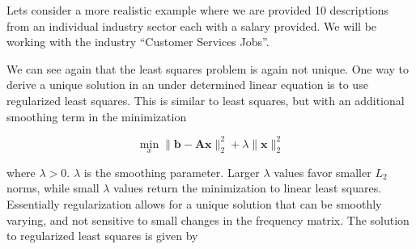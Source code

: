 \documentclass[12pt]{article}
\begin{document}
    Lets consider a more realistic example where we are provided 10
    descriptions from an individual industry sector each with a salary
    provided. We will be working with the industry ``Customer Services Jobs''. 
    
    \begin{center} 
        
        
    \end{center}

    We can see again that the least squares problem is again not unique. One
    way to derive a unique solution in an under determined linear equation is
    to use regularized least squares. This is similar to least squares, but
    with an additional smoothing term in the minimization

    \begin{equation}
        \min_x \|\bm{b} - \bm{Ax}\|_2^2 + \lambda\|\bm{x}\|_2^2
    \end{equation}

    \noindent where $\lambda > 0$. $\lambda$ is the smoothing parameter. Larger
    $\lambda$ values favor smaller $L_2$ norms, while small $\lambda$ values
    return the minimization to linear least squares.  Essentially
    regularization allows for a unique solution that can be smoothly varying,
    and not sensitive to small changes in the frequency matrix. The solution to
    regularized least squares is given by
\end{document}
